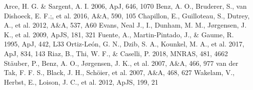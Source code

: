 \documentclass[a4paper]{article}
\renewenvironment{thebibliography}[1]{\begin{oldthebibliography}{#1}\setlength{\parskip}{0ex}\setlength{\itemsep}{0ex}}{\end{oldthebibliography}}
\begin{document}
\begin{thebibliography}{10}
{\small
{} Arce, H. G. & Sargent, A. I. 2006, ApJ, 646, 1070
 Benz, A. O., Bruderer, S., van Dishoeck, E. F.;, et al. 2016, A\&A, 590, 105
 Chapillon, E., Guilloteau, S., Dutrey, A., et al. 2012, A\&A, 537, A60
 Evans, Neal J., I., Dunham, M. M., Jørgensen, J. K., et al. 2009, ApJS, 181, 321
 Fuente, A., Martin-Pintado, J., & Gaume, R. 1995, ApJ, 442, L33
 Ortiz-León, G. N., Dzib, S. A., Kounkel, M. A., et al. 2017, ApJ, 834, 143
 Riaz, B., Thi, W. F., & Caselli, P. 2018, MNRAS, 481, 4662
 Stäuber, P., Benz, A. O., Jørgensen, J. K., et al. 2007, A\&A, 466, 977 
 van der Tak, F. F. S., Black, J. H., Schöier, et al. 2007, A\&A, 468, 627
 Wakelam, V., Herbst, E., Loison, J. C., et al. 2012, ApJS, 199, 21

}
\end{thebibliography}
\end{document}
